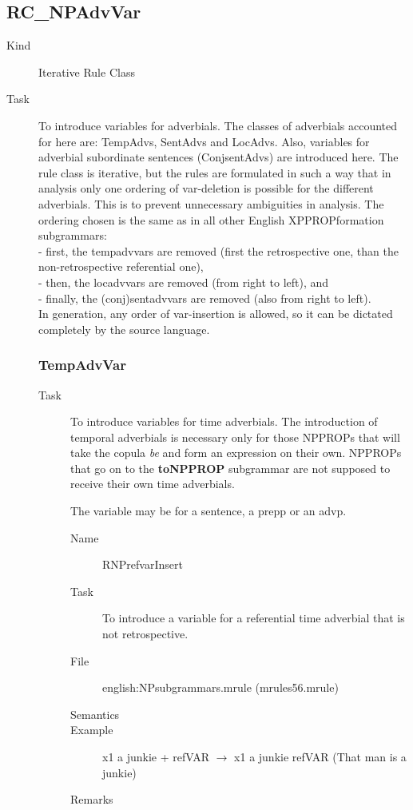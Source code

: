 \subsection{RC\_NPAdvVar}
\begin{description}
\item[Kind] Iterative Rule Class
\item[Task] To introduce variables for adverbials. The classes of adverbials 
accounted for here are: TempAdvs, SentAdvs and LocAdvs. Also, variables for 
adverbial subordinate sentences (ConjsentAdvs) are introduced here. 
The rule class is iterative, but the rules are 
formulated in such a way that in analysis only one ordering of 
var-deletion is possible 
for the different adverbials. This is to prevent unnecessary ambiguities in 
analysis. The ordering chosen is the same as in all other English 
XPPROPformation subgrammars:\\
- first, the tempadvvars are removed (first the retrospective one, than the 
non-retrospective referential one),\\
- then, the locadvvars are removed (from right to left), and\\
- finally, the (conj)sentadvvars are removed (also from right to left).\\
In generation, any order of var-insertion is allowed, so it can be dictated 
completely by the source language.

\subsubsection{TempAdvVar}
\begin{description}
\item[Task] To introduce variables for time adverbials. 
The introduction of temporal adverbials is necessary only for those NPPROPs 
that will take the copula {\em be\/} and form an expression on their own. 
NPPROPs that go on to the {\bf toNPPROP} subgrammar are not supposed to receive 
their own time adverbials. 

The variable may be for a sentence, a prepp or an advp. 

\vspace{1 cm}
\begin{description}
\item[Name] RNPrefvarInsert
\item[Task] To introduce a variable for a referential time adverbial that is 
not retrospective. 
\item[File] english:NPsubgrammars.mrule (mrules56.mrule)
\item[Semantics]
\item[Example] x1 a junkie + refVAR $\rightarrow$ x1 a junkie refVAR 
(That man is a junkie)
\item[Remarks]
\end{description}


\end{description}
\end{description}
